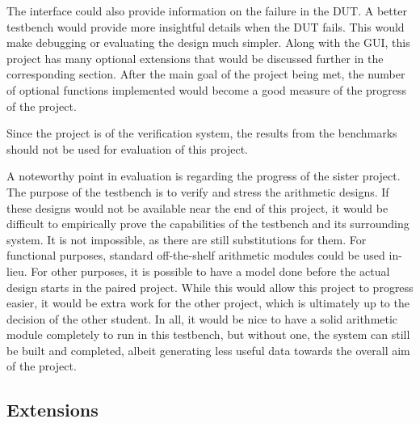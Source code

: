 The interface could also provide information on the failure in the DUT.
A better testbench would provide more insightful details when the DUT fails.
This would make debugging or evaluating the design much simpler.
Along with the GUI, this project has many optional extensions that would be
discussed further in the corresponding section.
After the main goal of the project being met, the number of optional functions
implemented would become a good measure of the progress of the project.

Since the project is of the verification system, the results from the benchmarks
should not be used for evaluation of this project.

A noteworthy point in evaluation is regarding the progress of the sister project.
The purpose of the testbench is to verify and stress the arithmetic designs.
If these designs would not be available near the end of this project,
it would be difficult to empirically prove the capabilities of the testbench
and its surrounding system.
It is not impossible, as there are still substitutions for them.
For functional purposes, standard off-the-shelf arithmetic modules could be
used in-lieu.
For other purposes, it is possible to have a model done before the actual design
starts in the paired project.
While this would allow this project to progress easier, it would be extra work
for the other project, which is ultimately up to the decision of the other
student.
In all, it would be nice to have a solid arithmetic module completely to run
in this testbench, but without one, the system can still be built and completed,
albeit generating less useful data towards the overall aim of the project.

\subsection{Extensions}

